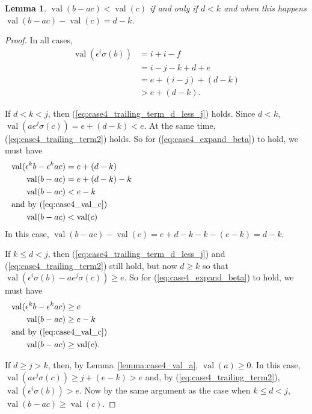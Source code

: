 \documentclass{amsart}
\newtheorem{lemma}{Lemma}[subsection]
\theoremstyle{definition}
\def\e{\epsilon}
\def\val{\mathop{\mathrm{val}}}
\def\s{\sigma}
\begin{document}
  \begin{lemma}
    \label{lemma:case4_val_b_m_ac}
    $\val(b - ac) < \val(c)$ if and only if $d < k$ and when this happens
    $\val(b - ac) - \val(c) = d - k$.
  \end{lemma}
  \begin{proof}
    In all cases,
    \begin{align}
      \val(\e^i\s(b)) &= i + i - f \nonumber \\
      &= i - j - k + d + e \nonumber \\
      &= e + (i - j) + (d - k) \nonumber \\
      \label{eq:case4_trailing_term2}
      &> e + (d - k).
    \end{align}
    
    If $d < k < j$, then (\ref{eq:case4_trailing_term_d_less_j}) holds.  Since
    $d < k$, $\val(ae^j\s(c)) = e + (d - k) < e$.  At the same time,
    (\ref{eq:case4_trailing_term2}) holds.  So for (\ref{eq:case4_expand_beta})
    to hold, we must have
    \begin{align*}
      \val(\e^k b - \e^k ac) &= e + (d-k) \\
      \val(b - ac)  &= e + (d - k) - k  \\
      \val(b - ac) &< e - k \\
      \noalign{\noindent and by (\ref{eq:case4_val_c})}
      \val(b - ac) &< \val(c)
    \end{align*}
    In this case, $\val(b-ac) - \val(c) = e + d - k - k - (e - k) = d - k$.

    If $k \le d < j$, then (\ref{eq:case4_trailing_term_d_less_j}) and
    (\ref{eq:case4_trailing_term2}) still hold, but now $d \ge k$ so that
    $\val(\e^i\s(b) - ae^j\s(c)) \ge e$.  So for
    (\ref{eq:case4_expand_beta}) to hold, we must have
    \begin{align*}
      \val(\e^k b - \e^k ac) &\ge e \\
      \val(b - ac) &\ge e - k  \\
      \noalign{\noindent and by (\ref{eq:case4_val_c})}
      \val(b-ac) &\ge \val(c) .
    \end{align*}

    If $d \ge j > k$, then, by Lemma~\ref{lemma:case4_val_a}, $\val(a) \ge 0$.
    In this case, $\val(a\e^j\s(c)) \ge j + (e - k) > e$ and, by
    (\ref{eq:case4_trailing_term2}), $\val(\e^i\s(b)) > e$.  Now by the same
    argument as the case when $k \le d <j$, $\val(b-ac) \ge \val(c)$.
  \end{proof}
\end{document}
